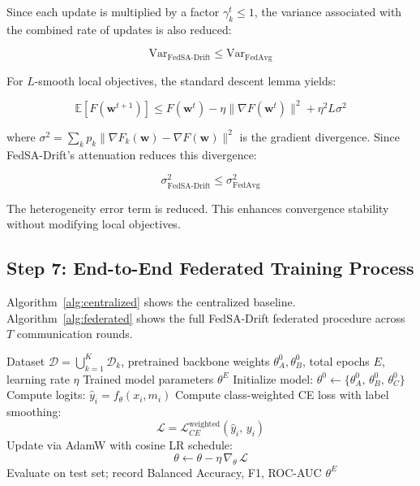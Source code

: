 \documentclass{ieeeaccess}
\newcommand{\sadrift}{FedSA-Drift}
\begin{document}
Since each update is multiplied by a factor $\gamma_k^t \le 1$, the variance associated with the combined rate of updates is also reduced:

\begin{equation}
\label{eq:var_inequality}
\mathrm{Var}_{\text{\sadrift{}}} \le \mathrm{Var}_{\text{FedAvg}}
\end{equation}

For $L$-smooth local objectives, the standard descent lemma yields:

\begin{equation}
\label{eq:convergence}
\mathbb{E}[F(\mathbf{w}^{t+1})]
\le
F(\mathbf{w}^t)
-
\eta \|\nabla F(\mathbf{w}^t)\|^2
+
\eta^2 L \sigma^2
\end{equation}

where $\sigma^2 = \sum_k p_k \|\nabla F_k(\mathbf{w}) - \nabla F(\mathbf{w})\|^2$ is the gradient divergence. Since \sadrift{}'s attenuation reduces this divergence:

\begin{equation}
\label{eq:sigma_inequality}
\sigma_{\text{\sadrift{}}}^2 \le \sigma_{\text{FedAvg}}^2
\end{equation}

The heterogeneity error term is reduced. This enhances convergence stability without modifying local objectives.

\subsection{Step 7: End-to-End Federated Training Process}

Algorithm~\ref{alg:centralized} shows the centralized baseline. Algorithm~\ref{alg:federated} shows the full \sadrift{} federated procedure across $T$ communication rounds.

\begin{algorithm}[t]
\caption{Centralized Training Baseline}
\label{alg:centralized}
\begin{algorithmic}[1]
\REQUIRE Dataset $\mathcal{D} = \bigcup_{k=1}^{K} \mathcal{D}_k$, pretrained backbone weights $\theta_A^0, \theta_B^0$, total epochs $E$, learning rate $\eta$
\ENSURE Trained model parameters $\theta^E$
\STATE Initialize model: $\theta^0 \leftarrow \{\theta_A^0,\, \theta_B^0,\, \theta_C^0\}$
        \STATE Compute logits: $\hat{y}_i = f_\theta(x_i, m_i)$
        \STATE Compute class-weighted CE loss with label smoothing:
               \[ \mathcal{L} = \mathcal{L}_{CE}^{\text{weighted}}(\hat{y}_i,\, y_i) \]
        \STATE Update via AdamW with cosine LR schedule:
               \[ \theta \leftarrow \theta - \eta\,\nabla_\theta\,\mathcal{L} \]
    \ENDFOR
    \STATE Evaluate on test set; record Balanced Accuracy, F1, ROC-AUC
\ENDFOR
\RETURN $\theta^E$
\end{algorithmic}
\end{algorithm}
\end{document}
